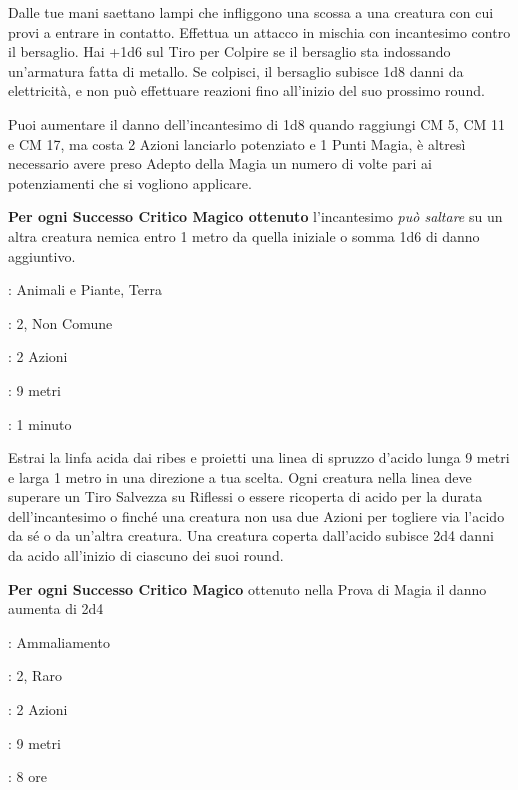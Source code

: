 \begin{multicols}{2}
Dalle tue mani saettano lampi che infliggono una scossa a una creatura con cui provi a entrare in contatto. Effettua un attacco in mischia con incantesimo contro il bersaglio. Hai +1d6 sul Tiro per Colpire se il bersaglio sta indossando un'armatura fatta di metallo. Se colpisci, il bersaglio subisce 1d8 danni da elettricità, e non può effettuare reazioni fino all'inizio del suo prossimo round.

Puoi aumentare il danno dell'incantesimo di 1d8 quando raggiungi CM 5, CM 11 e CM 17, ma costa 2 Azioni lanciarlo potenziato e 1 Punti Magia, è altresì necessario avere preso Adepto della Magia un numero di volte pari ai potenziamenti che si vogliono applicare.

\textbf{Per ogni Successo Critico Magico ottenuto} l'incantesimo \emph{può saltare} su un altra creatura nemica entro 1 metro da quella iniziale o somma 1d6 di danno aggiuntivo.

\noindent\colorbox{OBSSgold!10}{
\begin{minipage}{0.95\linewidth}
\begin{description}[noitemsep, topsep=0pt, parsep=0pt, partopsep=0pt, leftmargin=0cm, labelwidth=1.3cm]
	\item[\textbf{Lista}]: Animali e Piante, Terra
	\item[\textbf{Livello}]: 2, Non Comune
	\item[\textbf{Lancio}]: 2 Azioni
	\item[\textbf{Gittata}]: 9 metri
	\item[\textbf{Durata}]: 1 minuto
\end{description}
\end{minipage}}\smallskip

Estrai la linfa acida dai ribes e proietti una linea di spruzzo d'acido lunga 9 metri e larga 1 metro in una direzione a tua scelta. Ogni creatura nella linea deve superare un Tiro Salvezza su Riflessi o essere ricoperta di acido per la durata dell'incantesimo o finché una creatura non usa due Azioni per togliere via l'acido da sé o da un'altra creatura. Una creatura coperta dall'acido subisce 2d4 danni da acido all'inizio di ciascuno dei suoi round.

\textbf{Per ogni Successo Critico Magico} ottenuto nella Prova di Magia il danno aumenta di 2d4

\noindent\colorbox{OBSSgold!10}{
\begin{minipage}{0.95\linewidth}
\begin{description}[noitemsep, topsep=0pt, parsep=0pt, partopsep=0pt, leftmargin=0cm, labelwidth=1.3cm]
	\item[\textbf{Lista}]: Ammaliamento
	\item[\textbf{Livello}]: 2, Raro
	\item[\textbf{Lancio}]: 2 Azioni
	\item[\textbf{Gittata}]: 9 metri
	\item[\textbf{Durata}]: 8 ore
\end{description}
\end{minipage}}\smallskip


\end{multicols}
